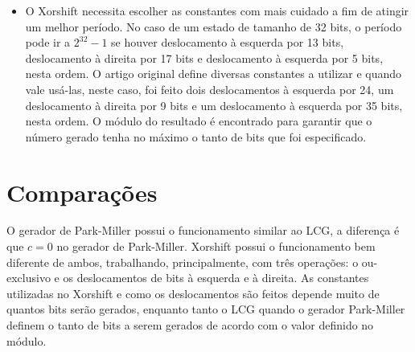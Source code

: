 \documentclass{article}
\begin{document}
\begin{itemize}
        \item O Xorshift necessita escolher as constantes com mais cuidado a
            fim de atingir um melhor período. No caso de um estado de tamanho
            de 32 bits, o período pode ir a $2^{32}-1$ se houver deslocamento à
            esquerda por 13 bits, deslocamento à direita por 17 bits e
            deslocamento à esquerda por 5 bits, nesta ordem. O artigo
            original\cite{Marsaglia2003} define diversas constantes a utilizar
            e quando vale usá-las, neste caso, foi feito dois deslocamentos à
            esquerda por 24, um deslocamento à direita por 9 bits e um
            deslocamento à esquerda por 35 bits, nesta ordem. O módulo do
            resultado é encontrado para garantir que o número gerado tenha no
            máximo o tanto de bits que foi especificado.
    \end{itemize}
    
\section*{Comparações}
    O gerador de Park-Miller possui o funcionamento similar ao LCG, a diferença
    é que $c = 0$ no gerador de Park-Miller. Xorshift possui o funcionamento
    bem diferente de ambos, trabalhando, principalmente, com três operações: o
    ou-exclusivo e os deslocamentos de bits à esquerda e à direita. As
    constantes utilizadas no Xorshift e como os deslocamentos são feitos
    depende muito de quantos bits serão gerados, enquanto tanto o LCG quando o
    gerador Park-Miller definem o tanto de bits a serem gerados de acordo com o
    valor definido no módulo.



\end{document}
